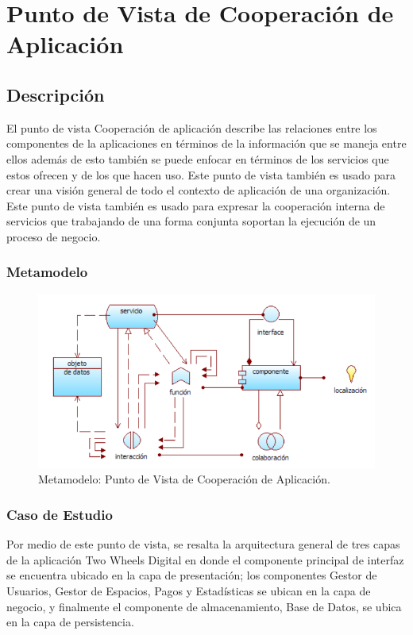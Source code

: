 \section{Punto de Vista de Cooperación de Aplicación}
\subsection{Descripción}
El punto de vista Cooperación de aplicación describe las relaciones entre los componentes de la aplicaciones en términos de la información que se maneja entre ellos además de esto también se puede enfocar en términos de los servicios que estos ofrecen y de los que hacen uso. Este punto de vista también es usado para crear una visión general de todo el contexto de aplicación de una organización. Este punto de vista también es usado para expresar la cooperación interna de servicios que trabajando de una forma conjunta soportan la ejecución de un proceso de negocio.

\subsubsection{Metamodelo}
\begin{figure}[H]
	\centering
	\includegraphics[width=1.0\textwidth]{imagenes/Metamodelos/Aplicacion/meta_cooperacion_aplicacion.png}
	\caption{Metamodelo: Punto de Vista de Cooperación de Aplicación.}
	\label{fig:gap_analysis}
\end{figure}

\subsubsection{Caso de Estudio}
Por medio de este punto de vista, se resalta la arquitectura general de tres capas de la aplicación Two Wheels Digital en donde el componente principal de interfaz se encuentra ubicado en la capa de presentación; los componentes Gestor de Usuarios, Gestor de Espacios, Pagos y Estadísticas se ubican en la capa de negocio, y finalmente el componente de almacenamiento, Base de Datos, se ubica en la capa de persistencia.

